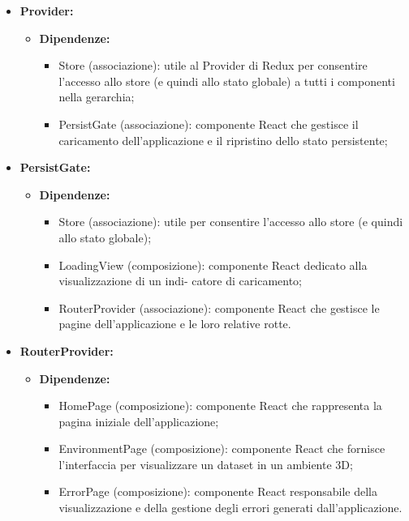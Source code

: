 \begin{itemize}
      \item \textbf{Provider:}
            \begin{itemize}
                  \item \textbf{Dipendenze:}
                        \begin{itemize}
                              \item Store (associazione): utile al Provider di Redux per consentire l'accesso allo
                                    store (e quindi allo stato globale) a tutti i componenti nella gerarchia;
                              \item PersistGate (associazione): componente React che gestisce il caricamento
                                    dell'applicazione e il ripristino dello stato persistente;
                        \end{itemize}
            \end{itemize}

      \item \textbf{PersistGate:}
      \begin{itemize}
            \item \textbf{Dipendenze:}
                  \begin{itemize}
                        \item Store (associazione): utile per consentire l'accesso allo
                              store (e quindi allo stato globale);
                        \item LoadingView (composizione): componente React dedicato alla visualizzazione di un indi-
                              catore di caricamento;
                        \item RouterProvider (associazione): componente React che gestisce le pagine
                        dell'applicazione e le loro relative rotte.
                  \end{itemize}
      \end{itemize}

      \item \textbf{RouterProvider:}
            \begin{itemize}
                  \item \textbf{Dipendenze:}
                        \begin{itemize}
                              \item HomePage (composizione): componente React che rappresenta la pagina iniziale
                                    dell'applicazione;
                              \item EnvironmentPage (composizione): componente React che fornisce l'interfaccia per
                                    visualizzare un dataset in un ambiente 3D;
                              \item ErrorPage (composizione): componente React responsabile della visualizzazione e
                                    della gestione degli errori generati dall'applicazione.
                        \end{itemize}
            \end{itemize}
\end{itemize}

